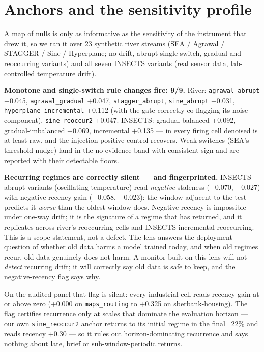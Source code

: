 \documentclass[10pt]{article} %
\begin{document}
\section{Anchors and the sensitivity profile}\label{sec:anchors}

A map of nulls is only as informative as the sensitivity of the instrument that drew it, so we ran
it over 23 synthetic river streams (SEA / Agrawal / STAGGER / Sine / Hyperplane; no-drift, abrupt
single-switch, gradual and reoccurring variants) and all seven INSECTS variants (real sensor data,
lab-controlled temperature drift).

\textbf{Monotone and single-switch rule changes fire: 9/9.} River: \texttt{agrawal\_abrupt} +0.045,
\texttt{agrawal\_gradual} +0.047, \texttt{stagger\_abrupt}, \texttt{sine\_abrupt} +0.031, \texttt{hyperplane\_incremental} +0.112 (with the
gate correctly co-flagging its noise component), \texttt{sine\_reoccur2} +0.047. INSECTS: gradual-balanced
+0.092, gradual-imbalanced +0.069, incremental +0.135 --- in every firing cell denoised is at least
raw, and the injection positive control recovers. Weak switches (SEA's threshold nudge) land in the
no-evidence band with consistent sign and are reported with their detectable floors.

\textbf{Recurring regimes are correctly silent --- and fingerprinted.} INSECTS abrupt variants
(oscillating temperature) read \emph{negative} staleness ($-0.070$, $-0.027$) with negative recency gain
($-0.058$, $-0.023$): the window adjacent to the test predicts it \emph{worse} than the oldest window does.
Negative recency is impossible under one-way drift; it is the signature of a regime that has
returned, and it replicates across river's reoccurring cells and INSECTS incremental-reoccurring.
This is a scope statement, not a defect. The lens answers the deployment question of whether old
data harms a model trained today, and when old regimes recur, old data genuinely does not harm. A
monitor built on this lens will not \emph{detect} recurring drift; it will correctly say old data is
safe to keep, and the negative-recency flag says why.

On the audited panel that flag is silent:
every industrial cell reads recency gain at or above zero (+0.000 on \texttt{maps\_routing} to +0.325 on
sberbank-housing). The flag certifies recurrence only at scales that dominate the evaluation
horizon --- our own \texttt{sine\_reoccur2} anchor returns to its initial regime in the final ~22\% and reads
recency +0.30 --- so it rules out horizon-dominating recurrence and says nothing about late, brief or
sub-window-periodic returns.
\end{document}
